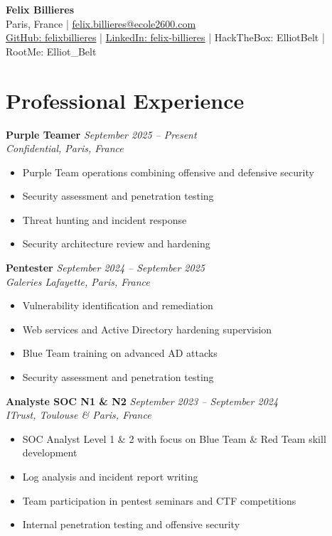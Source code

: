\documentclass[11pt,a4paper]{article}
\begin{document}
\begin{center}
    {\Huge \textbf{Felix Billieres}}  \\
    \vspace{3pt}
    Paris, France | \href{mailto:felix.billieres@ecole2600.com}{felix.billieres@ecole2600.com} \\
    \href{https://github.com/felixbillieres}{GitHub: felixbillieres} | 
    \href{https://linkedin.com/in/felix-billieres}{LinkedIn: felix-billieres} | 
    HackTheBox: ElliotBelt | RootMe: Elliot\_Belt
\end{center}

\vspace{5pt}

\section{Professional Experience}

\textbf{Purple Teamer} \hfill \textit{September 2025 -- Present} \\
\textit{Confidential, Paris, France}
\begin{itemize}[leftmargin=*, noitemsep]
    \item Purple Team operations combining offensive and defensive security
    \item Security assessment and penetration testing
    \item Threat hunting and incident response
    \item Security architecture review and hardening
\end{itemize}

\textbf{Pentester} \hfill \textit{September 2024 -- September 2025} \\
\textit{Galeries Lafayette, Paris, France}
\begin{itemize}[leftmargin=*, noitemsep]
    \item Vulnerability identification and remediation
    \item Web services and Active Directory hardening supervision
    \item Blue Team training on advanced AD attacks
    \item Security assessment and penetration testing
\end{itemize}

\textbf{Analyste SOC N1 \& N2} \hfill \textit{September 2023 -- September 2024} \\
\textit{ITrust, Toulouse \& Paris, France}
\begin{itemize}[leftmargin=*, noitemsep]
    \item SOC Analyst Level 1 \& 2 with focus on Blue Team \& Red Team skill development
    \item Log analysis and incident report writing
    \item Team participation in pentest seminars and CTF competitions
    \item Internal penetration testing and offensive security
\end{itemize}
\end{document}
